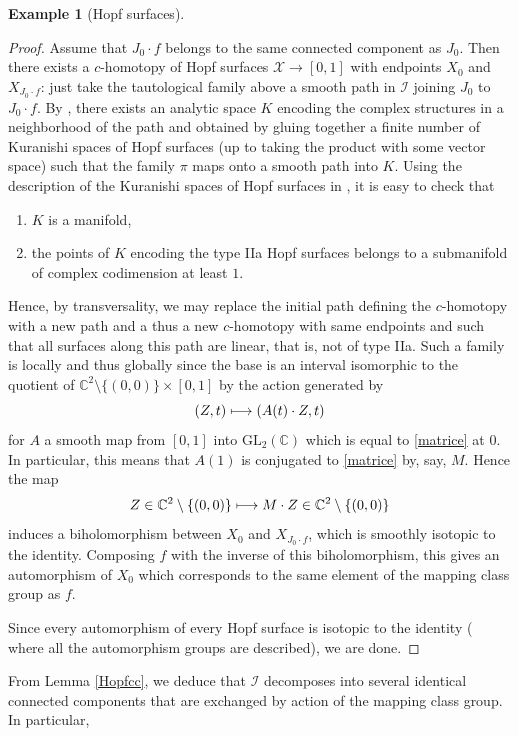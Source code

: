\documentclass[10pt]{amsart}
\let\mathcal\mathscr
\def\mto{\mathchoice{\longmapsto}{\mapsto}{\mapsto}{\mapsto}}
\newcommand{\GL}{\mathrm{GL}}
\theoremstyle{plain}
\theoremstyle{definition}
\newtheorem{example}[theorem]{Example}
\theoremstyle{remark}
\numberwithin{equation}{section}
\newcommand{\CC}{{\mathbb{C}}}
\newcommand{\cI}{\mathcal{I}}
\begin{document}
\begin{example}[Hopf surfaces]
\begin{proof}
Assume that $J_0\cdot f$ belongs to the same connected component as $J_0$. Then there exists a $c$-homotopy of Hopf surfaces $\mathcal X\to [0,1]$ with endpoints $X_0$ and $X_{J_0\cdot f}$: just take the tautological family above a smooth path in $\cI$ joining $J_0$ to $J_0\cdot f$. By \cite[Th.\,8.1]{circle}, there exists an analytic space $K$ encoding the complex structures in a neighborhood of the path and obtained by gluing together a finite number of Kuranishi spaces of Hopf surfaces (up to taking the product with some vector space) such that the family $\pi$ maps onto a smooth path into $K$. Using the description of the Kuranishi spaces of Hopf surfaces in \cite[Th.\,2]{We}, it is easy to check that
\begin{enumerate}
\item
$K$ is a manifold,
\item
the points of $K$ encoding the type IIa Hopf surfaces belongs to a submanifold of complex codimension at least $1$.
\end{enumerate}
Hence, by transversality, we may replace the initial path defining the $c$-homotopy with a new path and a thus a new $c$-homotopy with same endpoints and such that all surfaces along this path are linear, that is, not of type IIa.
Such a family is \hbox{locally} and thus globally since the base is an interval isomorphic to the quotient of \hbox{$\CC^2\setminus\{(0,0)\}\times [0,1]$} by the action generated by
\[
(Z,t)\mto (A(t)\cdot Z, t)
\]
for $A$ a smooth map from $[0,1]$ into $\GL_2(\CC)$ which is equal to \eqref{matrice} at $0$.
In particular, this means that $A(1)$ is conjugated to \eqref{matrice} by, say, $M$. Hence the map
\begin{equation}
\label{lineaire}
Z\in \CC^2\setminus\{(0,0)\}\mto M\cdot Z\in \CC^2\setminus\{(0,0)\}
\end{equation}
induces a biholomorphism between $X_0$ and $X_{J_0\cdot f}$, which is smoothly isotopic to the identity. Composing $f$ with the inverse of this biholomorphism, this gives an automorphism of $X_0$ which corresponds to the same element of the mapping class group as $f$.

Since every automorphism of every Hopf surface is isotopic to the identity (\cf \cite[p.\,24]{We} where all the automorphism groups are described), we are done.
\end{proof}
From Lemma \ref{Hopfcc}, we deduce that $\cI$ decomposes into several identical connected components that are exchanged by action of the mapping class group. In particular,


\end{example}
\end{document}
